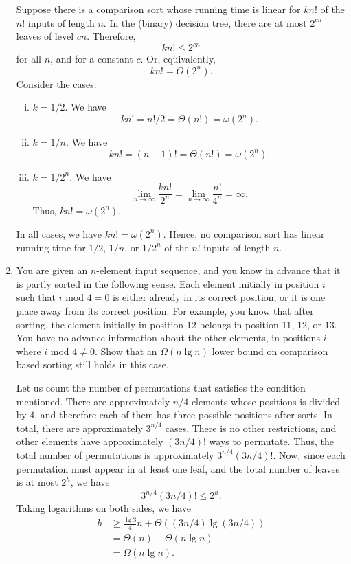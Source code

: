 \documentclass[12pt,reqno]{amsart}
\newif\ifanswer
\begin{document}
\begin{enumerate}[1.]
\ifanswer
{}
Suppose there is a comparison sort whose running time is linear for $kn!$ of the $n!$ inputs of length $n$. In the (binary) decision tree, there are at most $2^{cn}$ leaves of level $cn$. Therefore,
$$
kn! \leq 2^{cn}
$$
for all $n$, and for a constant $c$. Or, equivalently,
$$
kn! = O(2^n).
$$
Consider the cases:
\begin{enumerate}[(i)]
    \item $k = 1/2$. We have $$kn! = n!/2 = \Theta(n!) = \omega(2^n).$$
    \item $k = 1/n$. We have $$kn! = (n - 1)! = \Theta(n!) = \omega(2^n).$$
    \item $k = 1/2^n$. We have $$\lim_{n\to\infty}\frac{kn!}{2^n} = \lim_{n\to\infty}\frac{n!}{4^n} = \infty.$$ Thus, $kn! = \omega(2^n)$.
\end{enumerate}
In all cases, we have $kn! = \omega(2^n)$. Hence, no comparison sort has linear running time for $1/2$, $1/n$, or $1/2^n$ of the $n!$ inputs of length $n$.
\vspace{1cm}



\item You are given an $n$-element input sequence, and you know in advance that it is partly sorted in the following sense. Each element initially in position $i$ such that $i$ mod $4 = 0$ is either already in its correct position, or it is one place away from its correct position. For example, you know that after sorting, the element initially in position $12$ belongs in position $11$, $12$, or $13$. You have no advance information about the other elements, in positions $i$ where $i$ mod $4 \neq 0$. Show that an $\Omega(n\lg{n})$ lower bound on comparison based sorting still holds in this case.

\ifanswer
{}
Let us count the number of permutations that satisfies the condition mentioned. There are approximately $n/4$ elements whose positions is divided by $4$, and therefore each of them has three possible positions after sorts. In total, there are approximately $3^{n/4}$ cases. There is no other restrictions, and other elements have approximately $(3n/4)!$ ways to permutate. Thus, the total number of permutations is approximately $3^{n/4}(3n/4)!$. Now, since each permutation must appear in at least one leaf, and the total number of leaves is at most $2^{h}$, we have
$$
3^{n/4}(3n/4)! \leq 2^h.
$$
Taking logarithms on both sides, we have
\begin{align*}
h &\geq \frac{\lg{3}}{4}n + \Theta((3n/4)\lg{(3n/4)})\\
&= \Theta(n) + \Theta(n\lg{n})\\
&= \Omega(n\lg{n}).
\end{align*}
\vspace{1cm}



\end{enumerate}
\end{document}
